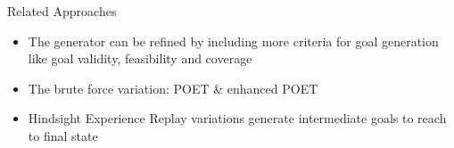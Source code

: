 \documentclass[aspectratio=169]{../latex_main/tntbeamer}  %
\begin{document}
\begin{frame}[c]{Related Approaches}
	
	\begin{itemize}
		\item The generator can be refined by including more criteria for goal generation like goal validity, feasibility and coverage 
		\item The brute force variation: POET  \& enhanced POET 
		\item Hindsight Experience Replay  variations generate intermediate goals to reach to final state
	\end{itemize}
	
\end{frame}
\end{document}
